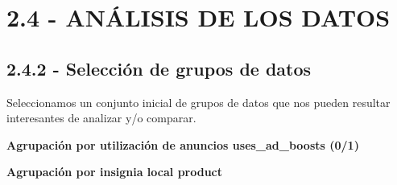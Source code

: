 \documentclass[
]{article}
\newenvironment{Shaded}{\begin{snugshade}}{\end{snugshade}}
\newcommand{\KeywordTok}[1]{\textcolor[rgb]{0.13,0.29,0.53}{\textbf{#1}}}
\newcommand{\NormalTok}[1]{#1}
\newcommand{\OperatorTok}[1]{\textcolor[rgb]{0.81,0.36,0.00}{\textbf{#1}}}
\newcommand{\StringTok}[1]{\textcolor[rgb]{0.31,0.60,0.02}{#1}}
\begin{document}
\begin{Shaded}
\end{Shaded}

\hypertarget{anuxe1lisis-de-los-datos}{%
\section{2.4 - ANÁLISIS DE LOS DATOS}\label{anuxe1lisis-de-los-datos}}

\hypertarget{selecciuxf3n-de-grupos-de-datos}{%
\subsection{2.4.2 - Selección de grupos de
datos}\label{selecciuxf3n-de-grupos-de-datos}}

Seleccionamos un conjunto inicial de grupos de datos que nos pueden
resultar interesantes de analizar y/o comparar.

\textbf{Agrupación por utilización de anuncios uses\_ad\_boosts (0/1)}

\begin{Shaded}
\end{Shaded}

\textbf{Agrupación por insignia local product}

\begin{Shaded}
\end{Shaded}
\end{document}
